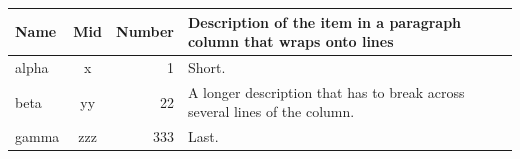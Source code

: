 \documentclass{article}
\begin{document}
\begin{center}
\begin{tabular}{|l|c|r|p{4cm}|}
\hline
Name & Mid & Number & Description of the item in a paragraph column that wraps onto lines \\
\hline
alpha & x & 1 & Short. \\
beta & yy & 22 & A longer description that has to break across several lines of the column. \\
gamma & zzz & 333 & Last. \\
\hline
\end{tabular}
\end{center}
\end{document}

